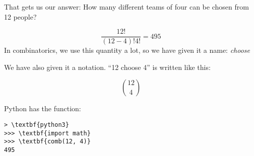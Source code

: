 That gets us our answer: How many different teams of four can be chosen from 12 people?

$$\frac{12!}{(12-4)! 4!}= 495$$
In combinatorics, we use this quantity a lot, so we have given it a name: \textit{choose}

We have also given it a notation. ``12 choose 4'' is written like this:

$${12 \choose 4}$$

Python has the  function:

\begin{Verbatim}[commandchars=\\\{\}]
> \textbf{python3}
>>> \textbf{import math}
>>> \textbf{comb(12, 4)}
495  
\end{Verbatim}

